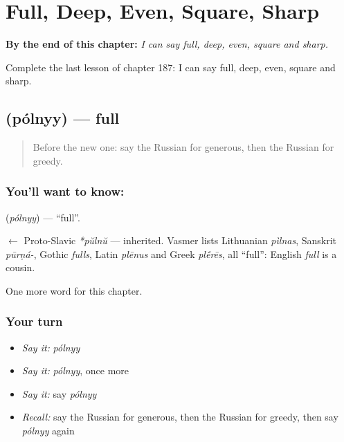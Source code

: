 
\chapter{Full, Deep, Even, Square, Sharp}
\label{ch:ru-full-deep-even-square-sharp}

\begin{chapteropening}
\textbf{By the end of this chapter:} \emph{I can say full, deep, even, square and sharp.}

Complete the last lesson of chapter 187: I can say full, deep, even, square and sharp.
\end{chapteropening}

\section[\texorpdfstring{\ru{полный} (pólnyy)}{полный (pólnyy)}]{ (pólnyy) — full}

\label{lesson:RU-C187-polnyy}



\begin{quote}
Before the new one: say the Russian for generous, then the Russian for greedy.
\end{quote}

\subsection*{You'll want to know: }
\textbf{} (\emph{pólnyy}) — \textquotedblleft{}full\textquotedblright{}.

\begin{cousinweb}
\textbf{} $\leftarrow$ Proto-Slavic \emph{*pŭlnŭ} — inherited. Vasmer lists Lithuanian \emph{pìlnas}, Sanskrit \emph{pūrṇá-}, Gothic \emph{fulls}, Latin \emph{plēnus} and Greek \emph{pl\'{\={e}}rēs}, all \textquotedblleft{}full\textquotedblright{}: English \emph{full} is a cousin.
\end{cousinweb}

\begin{grammarlens}[title={What you've built}]
One more word for this chapter.
\end{grammarlens}

\subsection*{Your turn}
\begin{itemize}
\raggedright
  \item \emph{Say it:} \emph{pólnyy}
  \item \emph{Say it:} \emph{pólnyy}, once more
  \item \emph{Say it:} say \emph{pólnyy}
  \item \emph{Recall:} say the Russian for generous, then the Russian for greedy, then say \emph{pólnyy} again
\end{itemize}

